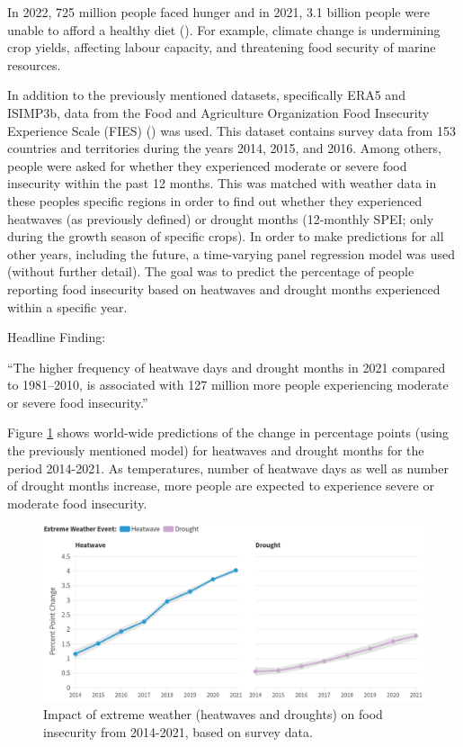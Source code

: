 \documentclass[
]{krantz}
\begin{document}
In 2022, 725 million people faced hunger and in 2021, 3.1 billion people were unable to afford a healthy diet (\citet{fao2023}). For example, climate change is undermining crop yields, affecting labour capacity, and threatening food security of marine resources.

In addition to the previously mentioned datasets, specifically ERA5 and ISIMP3b, data from the Food and Agriculture Organization Food Insecurity Experience Scale (FIES) (\citet{cafiero2018}) was used. This dataset contains survey data from 153 countries and territories during the years 2014, 2015, and 2016. Among others, people were asked for whether they experienced moderate or severe food insecurity within the past 12 months. This was matched with weather data in these peoples specific regions in order to find out whether they experienced heatwaves (as previously defined) or drought months (12-monthly SPEI; only during the growth season of specific crops). In order to make predictions for all other years, including the future, a time-varying panel regression model was used (without further detail). The goal was to predict the percentage of people reporting food insecurity based on heatwaves and drought months experienced within a specific year.

Headline Finding:

``The higher frequency of heatwave days and drought months in 2021 compared to 1981--2010, is associated with 127 million more people experiencing moderate or severe food insecurity.''

Figure \ref{fig:food1strobl} shows world-wide predictions of the change in percentage points (using the previously mentioned model) for heatwaves and drought months for the period 2014-2021. As temperatures, number of heatwave days as well as number of drought months increase, more people are expected to experience severe or moderate food insecurity.

\begin{figure}

{\centering \includegraphics[width=1\linewidth]{work/08-lancet/figures/indicator_3_1} 

}

\caption{Impact of extreme weather (heatwaves and droughts) on food insecurity from 2014-2021, based on survey data.}\label{fig:food1strobl}
\end{figure}
\end{document}
